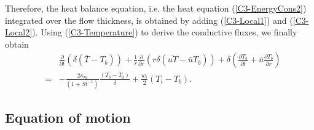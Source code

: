 Therefore,  the  heat  balance   equation,  i.e.   the  heat  equation
(\ref{C3-EnergyCons2}) integrated over the flow thickness, is obtained
by    adding   (\ref{C3-Local1})    and   (\ref{C3-Local2}).     Using
(\ref{C3-Temperature})  to derive  the conductive  fluxes, we  finally
obtain
\begin{eqnarray}
  &&\frac{\partial}{\partial t}\left( \delta( \bar{T}-T_b)\right)+\frac{1}{r}\frac{\partial}{\partial r} \left( r\delta(\overline{uT}-\bar{u}T_b)\right) + \delta\left( \frac{\partial T_b}{\partial t}+ \overline{u}\frac{\partial T_b}{\partial r}\right)\nonumber\\
  &=&-\frac{2\kappa_m}{(1+St^{-1})}\frac{\left( T_b - T_0\right)}{\delta}+\frac{w_{i}}{2}(T_{i}-T_b).
      \label{C3-LocalHeat3}
\end{eqnarray}

\subsection{Equation of motion}
\label{C3-sec:equation-motion}


